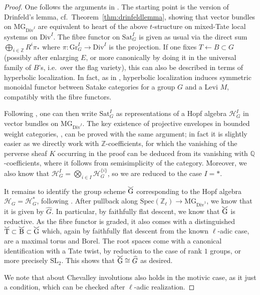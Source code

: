\documentclass[11pt]{amsart}
\newcommand\widecheck[1]{%
\savestack{\tmpbox}{\stretchto{%
  \scaleto{%
    \scalerel*[\widthof{\ensuremath{#1}}]{\kern-.6pt\bigwedge\kern-.6pt}%
    {\rule[-\textheight/2]{1ex}{\textheight}}%
  }{\textheight}%
}{0.5ex}}%
\stackon[1pt]{#1}{\scalebox{-1}{\tmpbox}}%
}
\numberwithin{equation}{section}
\numberwithin{theorem}{section}
\theoremstyle{definition}
\begin{document}
\begin{proof} One follows the arguments in \cite[Sections VI.9 -- VI.11]{FarguesScholze}. The starting point is the version of Drinfeld's lemma, cf.~Theorem~\ref{thm:drinfeldlemma}, showing that vector bundles on $\mathrm{MG}_{\mathrm{Div}^I}$ are equivalent to heart of the above $t$-structure on mixed-Tate local systems on $\mathrm{Div}^I$. The fibre functor on $\mathrm{Sat}_G^I$ is given as usual via the direct sum $\bigoplus_{i\in \mathbb Z} R^i\pi_\ast$ where $\pi: \mathrm{Gr}_G^I\to \mathrm{Div}^I$ is the projection. If one fixes $T\leftarrow B\subset G$ (possibly after enlarging $E$, or more canonically by doing it in the universal family of $B$'s, i.e.~over the flag variety), this can also be described in terms of hyperbolic localization. In fact, as in \cite[Proposition VI.9.6]{FarguesScholze}, hyperbolic localization induces symmetric monoidal functor between Satake categories for a group $G$ and a Levi $M$, compatibly with the fibre functors.

Following \cite[Section VI.10]{FarguesScholze}, one can then write $\mathrm{Sat}_G^I$ as representations of a Hopf algebra $\mathcal H_G^I$ in vector bundles on $\mathrm{MG}_{\mathrm{Div}^I}$. The key existence of projective envelopes in bounded weight categories, \cite[Proposition VI.10.1]{FarguesScholze}, can be proved with the same argument; in fact it is slightly easier as we directly work with $\mathbb Z$-coefficients, for which the vanishing of the perverse sheaf $K$ occurring in the proof can be deduced from its vanishing with $\mathbb Q$-coefficients, where it follows from semisimplicity of the category. Moreover, we also know that $\mathcal H_G^I = \bigotimes_{i\in I} \mathcal H_G^{\{i\}}$, so we are reduced to the case $I=\ast$.

It remains to identify the group scheme $\widecheck{G}$ corresponding to the Hopf algebra $\mathcal H_G = \mathcal H_G^\ast$, following \cite[Section VI.11]{FarguesScholze}. After pullback along $\mathrm{Spec}(\mathbb Z_\ell)\to \mathrm{MG}_{\mathrm{Div}^1}$, we know that it is given by $\widehat{G}$. In particular, by faithfully flat descent, we know that $\widecheck{G}$ is reductive. As the fibre functor is graded, it also comes with a distinguished $\widecheck{T}\subset \widecheck{B}\subset \widecheck{G}$ which, again by faithfully flat descent from the known $\ell$-adic case, are a maximal torus and Borel. The root spaces come with a canonical identification with a Tate twist, by reduction to the case of rank $1$ groups, or more precisely $\mathrm{SL}_2$. This shows that $\widecheck{G}\cong \widehat{G}$ as desired.

We note that \cite[Proposition VI.12.1]{FarguesScholze} about Chevalley involutions also holds in the motivic case, as it just a condition, which can be checked after $\ell$-adic realization.
\end{proof}
\end{document}

